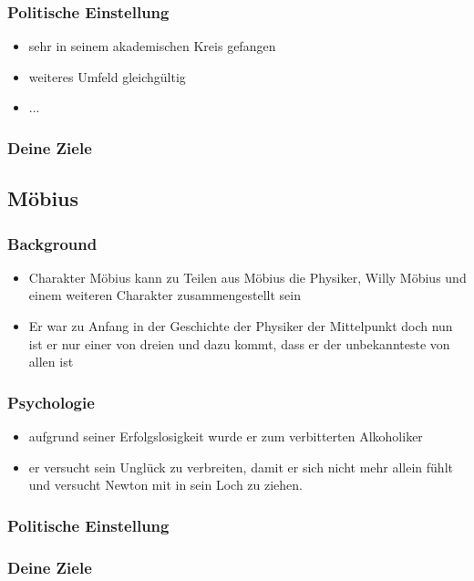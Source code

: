 \documentclass[12pt, a4paper, openany]{report}
\begin{document}
\subsubsection{Politische Einstellung}
\begin{itemize}
\item sehr in seinem akademischen Kreis gefangen
\item weiteres Umfeld gleichgültig
\item ...
\end{itemize}
\subsubsection{Deine Ziele}

\subsection{Möbius}
\subsubsection{Background}
\begin{itemize}
\item Charakter Möbius kann zu Teilen aus Möbius die Physiker, Willy Möbius und einem weiteren Charakter zusammengestellt sein
\item Er war zu Anfang in der Geschichte der Physiker der Mittelpunkt doch nun ist er nur einer von dreien und dazu kommt, dass er der unbekannteste von allen ist
\end{itemize}

\subsubsection{Psychologie}
\begin{itemize}
\item aufgrund seiner Erfolgslosigkeit wurde er zum verbitterten Alkoholiker
\item er versucht sein Unglück zu verbreiten, damit er sich nicht mehr allein fühlt und versucht Newton mit in sein Loch zu ziehen.
\end{itemize}
\subsubsection{Politische Einstellung}
\subsubsection{Deine Ziele}
\end{document}
